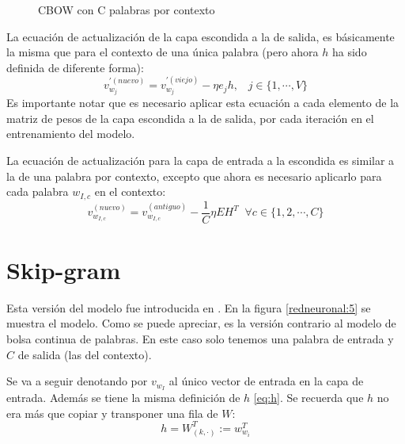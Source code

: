 \begin{figure}[h]
  \caption{CBOW con C palabras por contexto}
  \label{redneuronal:4}
\end{figure}

La ecuación de actualización de la capa escondida a la de salida, es básicamente la misma que para el contexto de una
única palabra (pero ahora $h$ ha sido definida de diferente forma):
\begin{equation}
  v_{w_j}^{'(nuevo)}=v_{w_j}^{'(viejo)} - \eta e_j h, \;\;\; j \in \{1, \cdots, V\}
\end{equation}
Es importante notar que es necesario aplicar esta ecuación a cada elemento de la matriz de pesos de la capa escondida a la de salida,
por cada iteración en el entrenamiento del modelo.

La ecuación de actualización para la capa de entrada a la escondida es similar a la de una palabra por contexto, excepto que ahora es
necesario aplicarlo para cada palabra $w_{I,c}$ en el contexto:
\begin{equation}
  v_{w_{I,c}}^{(nuevo)} = v_{w_{I,c}}^{(antiguo)} - \frac{1}{C}\eta EH^T \;\; \forall c \in \{1,2,\cdots, C \}
\end{equation}

\section{Skip-gram}

Esta versión del modelo fue introducida en \cite{word2vec:1} \cite{word2vec:2}. En la figura \ref{redneuronal:5} se muestra el modelo. Como se
puede apreciar, es la versión contrario al modelo de bolsa continua de palabras. En este caso solo tenemos una palabra de entrada y $C$ de salida (las
del contexto).

Se va a seguir denotando por $v_{w_I}$ al único vector de entrada en la capa de entrada. Además se tiene la misma definición de $h$ \ref{eq:h}. Se recuerda que $h$
no era más que copiar y transponer una fila de $W$:
\[
  h = W_{(k,\cdot)}^T := w_{w_i}^T
\]


